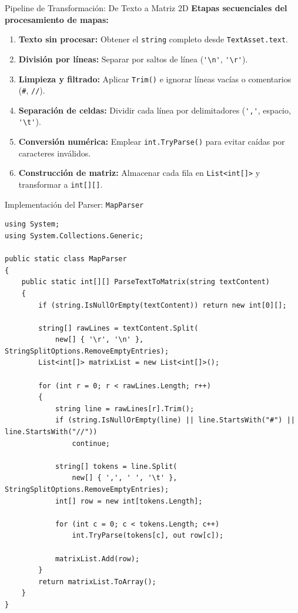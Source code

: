 \documentclass{beamer}
\begin{document}
\begin{frame}{Pipeline de Transformaci\'on: De Texto a Matriz 2D}
  \textbf{Etapas secuenciales del procesamiento de mapas:}

  \vspace{0.3cm}
  \begin{enumerate}
    \item \textbf{Texto sin procesar:} Obtener el \texttt{string} completo desde \texttt{TextAsset.text}.
    \item \textbf{Divisi\'on por l\'ineas:} Separar por saltos de l\'inea (\verb|'\n'|, \verb|'\r'|).
    \item \textbf{Limpieza y filtrado:} Aplicar \texttt{Trim()} e ignorar l\'ineas vac\'ias o comentarios (\texttt{\#}, \texttt{//}).
    \item \textbf{Separaci\'on de celdas:} Dividir cada l\'inea por delimitadores (\verb|','|, espacio, \verb|'\t'|).
    \item \textbf{Conversi\'on num\'erica:} Emplear \texttt{int.TryParse()} para evitar ca\'idas por caracteres inv\'alidos.
    \item \textbf{Construcci\'on de matriz:} Almacenar cada fila en \texttt{List<int[]>} y transformar a \texttt{int[][]}.
  \end{enumerate}
\end{frame}

\begin{frame}[fragile]{Implementaci\'on del Parser: \texttt{MapParser}}
\lstset{style=CSharpStyle}
\begin{lstlisting}
using System;
using System.Collections.Generic;

public static class MapParser
{
    public static int[][] ParseTextToMatrix(string textContent)
    {
        if (string.IsNullOrEmpty(textContent)) return new int[0][];

        string[] rawLines = textContent.Split(
            new[] { '\r', '\n' }, StringSplitOptions.RemoveEmptyEntries);
        List<int[]> matrixList = new List<int[]>();

        for (int r = 0; r < rawLines.Length; r++)
        {
            string line = rawLines[r].Trim();
            if (string.IsNullOrEmpty(line) || line.StartsWith("#") || line.StartsWith("//"))
                continue;

            string[] tokens = line.Split(
                new[] { ',', ' ', '\t' }, StringSplitOptions.RemoveEmptyEntries);
            int[] row = new int[tokens.Length];

            for (int c = 0; c < tokens.Length; c++)
                int.TryParse(tokens[c], out row[c]);

            matrixList.Add(row);
        }
        return matrixList.ToArray();
    }
}
\end{lstlisting}
\end{frame}
\end{document}
